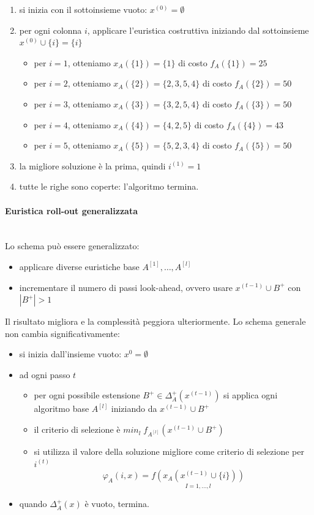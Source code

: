 \documentclass{article}
\begin{document}
\begin{enumerate}
    \item si inizia con il sottoinsieme vuoto: $x^{(0)}=\emptyset$
    \item per ogni colonna $i$, applicare l'euristica costruttiva iniziando dal
          sottoinsieme $x^{(0)}\cup\{i\}=\{i\}$
          \begin{itemize}
              \item per $i=1$, otteniamo $x_A(\{1\})=\{1\}$ di costo $f_A(\{1\})=25$
              \item per $i=2$, otteniamo $x_A(\{2\})=\{2,3,5,4\}$ di costo $f_A(\{2\})=50$
              \item per $i=3$, otteniamo $x_A(\{3\})=\{3,2,5,4\}$ di costo $f_A(\{3\})=50$
              \item per $i=4$, otteniamo $x_A(\{4\})=\{4,2,5\}$ di costo $f_A(\{4\})=43$
              \item per $i=5$, otteniamo $x_A(\{5\})=\{5,2,3,4\}$ di costo $f_A(\{5\})=50$
          \end{itemize}
    \item la migliore soluzione è la prima, quindi $i^{(1)}=1$
    \item tutte le righe sono coperte: l'algoritmo termina.
\end{enumerate}

\paragraph{Euristica roll-out generalizzata}\mbox{}\\
Lo schema può essere generalizzato:
\begin{itemize}
    \item applicare diverse euristiche base $A^{[1]},\dots , A^{[l]}$
    \item incrementare il numero di passi look-ahead, ovvero usare $x^{(t-1)}\cup B^+$ con $|B^+|>1$
\end{itemize}
Il risultato migliora e la complessità peggiora ulteriormente. Lo schema generale non
cambia significativamente:
\begin{itemize}
    \item si inizia dall'insieme vuoto: $x^{0}=\emptyset$
    \item ad ogni passo $t$
          \begin{itemize}
              \item per ogni possibile estensione $B^+\in\Delta_A^+(x^{(t-1)})$
                    si applica ogni algoritmo base $A^{[l]}$ iniziando da $x^{(t-1)}\cup B^+$
              \item il criterio di selezione è $min_l\; f_{A^{[l]}}(x^{(t-1)}\cup B^+)$
              \item si utilizza il valore della soluzione migliore come criterio di selezione per $i^{(t)}$
                    $$\varphi_A(i,x)=\underset{I=1,\dots,l}{f(x_A(x^{(t-1)}\cup\{i\}))}$$
          \end{itemize}
    \item quando $\Delta_A^+(x)$ è vuoto, termina.
\end{itemize}
\end{document}
